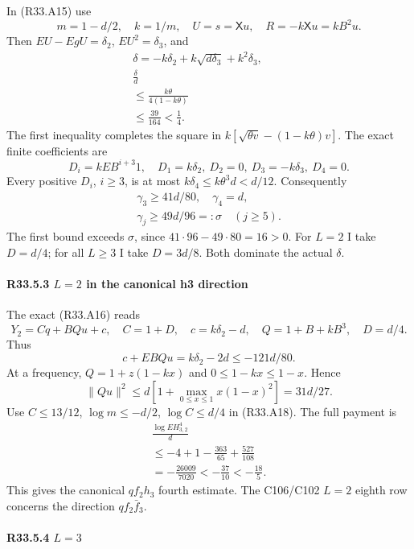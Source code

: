 In (R33.A15) use
\[
m=1-d/2,\quad k=1/m,\quad U=s=\mathsf Xu,\quad
R=-k\mathsf Xu=kB^2u.
\]
Then \(EU-EgU=\delta_2\), \(EU^2=\delta_3\), and
\[
\begin{gathered}
\delta=-k\delta_2+k\sqrt{d\delta_3}+k^2\delta_3,\qquad\\
\frac{\delta}{d}\\
\le\frac{k\theta}{4(1-k\theta)}\\
\le\frac{39}{164}<\frac14.
\end{gathered}\tag{R33.A28}
\]
The first inequality completes the square in
\(k[\sqrt{\theta v}-(1-k\theta)v]\).
The exact finite coefficients are
\[
D_i=kEB^{i+3}1,\quad
D_1=k\delta_2,\ D_2=0,\ D_3=-k\delta_3,\ D_4=0.
\]
Every positive \(D_i\), \(i\ge3\), is at most
\(k\delta_4\le k\theta^3d<d/12\). Consequently
\[
\begin{gathered}
\gamma_3\ge41d/80,\quad \gamma_4=d,\quad\\
\gamma_j\ge49d/96=:\sigma\quad(j\ge5).
\end{gathered}\tag{R33.A29}
\]
The first bound exceeds \(\sigma\), since
\(41\cdot96-49\cdot80=16>0\).
For \(L=2\) I take \(D=d/4\); for all \(L\ge 3\) I take \(D=3d/8\).
Both dominate the actual \(\delta\).

\paragraph{R33.5.3 \(L=2\) in the canonical h3 direction}

The exact (R33.A16) reads
\[
Y_2=Cq+BQu+c,\quad
C=1+D,\quad c=k\delta_2-d,\quad Q=1+B+kB^3,\quad D=d/4.
\]
Thus
\[
c+EBQu=k\delta_2-2d\le-121d/80.
\]
At a frequency, \(Q=1+z(1-kx)\) and
\(0\le1-kx\le1-x\). Hence
\[
\|Qu\|^2\le d\left[1+\max_{0\le x\le1}x(1-x)^2\right]
=31d/27.
\]
Use \(C\le13/12\), \(\log m\le-d/2\), \(\log C\le d/4\)
in (R33.A18). The full payment is
\[
\begin{gathered}
\frac{\log EH_{3,2}^4}{d}\\
\le-4+1-\frac{363}{65}+\frac{527}{108}\\
=-\frac{26009}{7020}<-\frac{37}{10}<-\frac{18}{5}.
\end{gathered}\tag{R33.A30}
\]
This gives the canonical \(qf_2h_3\) fourth estimate.
The C106/C102 \(L=2\) eighth row concerns the direction
\(qf_2\bar f_3\).

\paragraph{R33.5.4 \(L=3\)}

